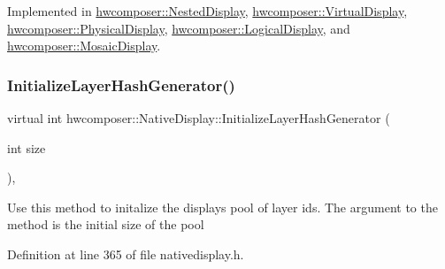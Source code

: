 Implemented in \mbox{\hyperlink{classhwcomposer_1_1NestedDisplay_a40b99528a66752bbdf03f253476e5255}{hwcomposer\+::\+Nested\+Display}}, \mbox{\hyperlink{classhwcomposer_1_1VirtualDisplay_a86d1fb5bdab8aa74d11d223313fb4fd0}{hwcomposer\+::\+Virtual\+Display}}, \mbox{\hyperlink{classhwcomposer_1_1PhysicalDisplay_a594319095f4b6c7078282c56d9cbe9f4}{hwcomposer\+::\+Physical\+Display}}, \mbox{\hyperlink{classhwcomposer_1_1LogicalDisplay_a280447edbcba240ec782928273d87c65}{hwcomposer\+::\+Logical\+Display}}, and \mbox{\hyperlink{classhwcomposer_1_1MosaicDisplay_a31b15aba0948d8e1c65f12f2d79f1ecf}{hwcomposer\+::\+Mosaic\+Display}}.

\mbox{\label{classhwcomposer_1_1NativeDisplay_ae6fdebc523f394adc23f10a8df58e296}} 
\subsubsection{\texorpdfstring{Initialize\+Layer\+Hash\+Generator()}{InitializeLayerHashGenerator()}}
{\footnotesize\ttfamily virtual int hwcomposer\+::\+Native\+Display\+::\+Initialize\+Layer\+Hash\+Generator (\begin{DoxyParamCaption}\item[{int}]{size }\end{DoxyParamCaption})\hspace{0.3cm}{\ttfamily [inline]}, {\ttfamily [virtual]}}

Use this method to initalize the display\textquotesingle{}s pool of layer ids. The argument to the method is the initial size of the pool 

Definition at line 365 of file nativedisplay.\+h.


\begin{DoxyCode}{0}
\end{DoxyCode}
\mbox{\label{classhwcomposer_1_1NativeDisplay_abeaa73138aad163b3da6263818990ba4}} 
